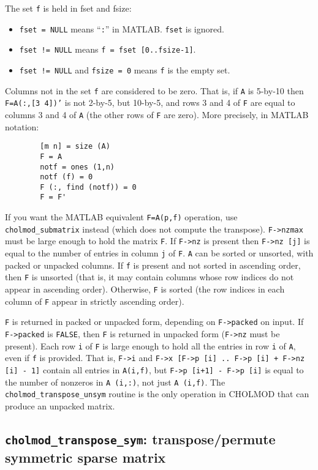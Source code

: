 \documentclass[11pt]{article}
\begin{document}
\noindent
The set {\tt f} is held in fset and fsize:
\begin{itemize}
\item  {\tt fset = NULL} means ``{\tt :}'' in MATLAB. {\tt fset} is ignored.
\item  {\tt fset != NULL} means {\tt f = fset [0..fsize-1]}.
\item  {\tt fset != NULL} and {\tt fsize = 0} means {\tt f} is the empty set.
\end{itemize}
 
Columns not in the set {\tt f} are considered to be zero.  That is,
if {\tt A} is 5-by-10 then {\tt F=A(:,[3 4])'} is not 2-by-5, but 10-by-5,
and rows 3 and 4 of {\tt F} are equal to columns 3 and 4 of {\tt A} (the other
rows of {\tt F} are zero).  More precisely, in MATLAB notation:

\begin{verbatim}
        [m n] = size (A)
        F = A
        notf = ones (1,n)
        notf (f) = 0
        F (:, find (notf)) = 0
        F = F'
\end{verbatim}

If you want the MATLAB equivalent {\tt F=A(p,f)} operation, use
{\tt cholmod\_submatrix} instead (which does not compute the transpose).
{\tt F->nzmax} must be large enough to hold the matrix {\tt F}.
If {\tt F->nz} is present then {\tt F->nz [j]} is equal to the number of entries in column {\tt j} of {\tt F}.
{\tt A} can be sorted or unsorted, with packed or unpacked columns.
If {\tt f} is present and not sorted in ascending order, then {\tt F} is unsorted
(that is, it may contain columns whose row indices do not appear in
ascending order).  Otherwise, {\tt F} is sorted (the row indices in each
column of {\tt F} appear in strictly ascending order).

{\tt F} is returned in packed or unpacked form, depending on {\tt F->packed} on input.
If {\tt F->packed} is {\tt FALSE}, then {\tt F} is returned in unpacked form ({\tt F->nz} must be
present).  Each row {\tt i} of {\tt F} is large enough to hold all the entries in row {\tt i}
of {\tt A}, even if {\tt f} is provided.  That is, {\tt F->i} and
{\tt F->x [F->p [i] .. F->p [i] + F->nz [i] - 1]} contain all entries in {\tt A(i,f)},
but {\tt F->p [i+1] - F->p [i]} is equal to the number of nonzeros in {\tt A (i,:)},
not just {\tt A (i,f)}.
The {\tt cholmod\_transpose\_unsym} routine is the only operation in CHOLMOD that
can produce an unpacked matrix.

\subsection{{\tt cholmod\_transpose\_sym}: transpose/permute symmetric sparse matrix}
\end{document}
